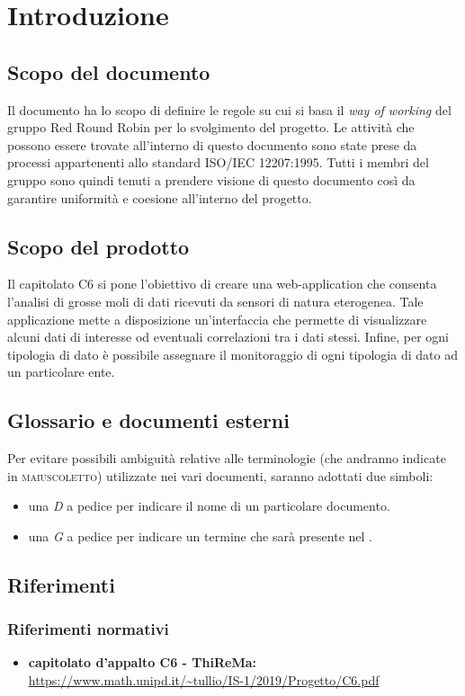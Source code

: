 \section{Introduzione}
	\subsection{Scopo del documento}
		Il documento ha lo scopo di definire le regole su cui si basa il \textit{way of working} del gruppo Red Round Robin per lo svolgimento del progetto. Le attività che possono essere trovate all'interno di questo documento sono state prese da processi appartenenti allo standard ISO/IEC 12207:1995. Tutti i membri del gruppo sono quindi tenuti a prendere visione di questo documento così da garantire uniformità e coesione all'interno del progetto.   
	\subsection{Scopo del prodotto}
		Il capitolato C6 si pone l'obiettivo di creare una web-application che consenta l'analisi di grosse moli di dati ricevuti da sensori di natura eterogenea. Tale applicazione mette a disposizione un'interfaccia che permette di visualizzare alcuni dati di interesse od eventuali correlazioni tra i dati stessi. Infine, per ogni tipologia di dato è possibile assegnare il monitoraggio di ogni tipologia di dato ad un particolare ente. 
	\subsection{Glossario e documenti esterni}
		Per evitare possibili ambiguità relative alle terminologie (che andranno indicate in \textsc{maiuscoletto}) utilizzate nei vari documenti, saranno adottati due simboli:
		\begin{itemize}
			\item una \textit{D} a pedice per indicare il nome di un particolare documento.
			\item una \textit{G} a pedice per indicare un termine che sarà 
			presente nel .
		\end{itemize}
	\subsection{Riferimenti}

		\subsubsection{Riferimenti normativi}
			\begin{itemize}
				\item \textbf{capitolato d'appalto C6 - ThiReMa: } \\
				\url{https://www.math.unipd.it/~tullio/IS-1/2019/Progetto/C6.pdf}
			\end{itemize}	

